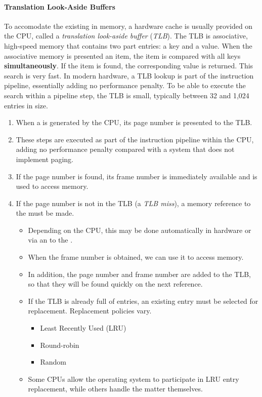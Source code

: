 \paragraph{Translation Look-Aside Buffers}\label{par:Translation_Look_Aside_Buffers}
To accomodate the  existing in memory, a hardware cache is usually provided on the CPU, called a \emph{translation look-aside buffer} (\emph{TLB}).
The TLB is associative, high-speed memory that contains two part entries: a key and a value.
When the associative memory is presented an item, the item is compared with all keys \textbf{simultaneously}.
If the item is found, the corresponding value is returned.
This search is very fast.
In modern hardware, a TLB lookup is part of the instruction pipeline, essentially adding no performance penalty.
To be able to execute the search within a pipeline step, the TLB is small, typically between 32 and 1,024  entries in size.

\begin{enumerate}[noitemsep]
\item When a  is generated by the CPU, its page number is presented to the TLB.\@
\item These steps are executed as part of the instruction pipeline within the CPU, adding no performance penalty compared with a system that does not implement paging.
\item If the page number is found, its frame number is immediately available and is used to access memory.
\item If the page number is not in the TLB (a \emph{TLB miss}), a memory reference to the  must be made.
  \begin{itemize}[noitemsep]
  \item Depending on the CPU, this may be done automatically in hardware or via an  to the .
  \item When the frame number is obtained, we can use it to access memory.
  \item In addition, the page number and frame number are added to the TLB, so that they will be found quickly on the next reference.
  \item If the TLB is already full of entries, an existing entry must be selected for replacement. Replacement policies vary.
    \begin{itemize}[noitemsep]
    \item Least Recently Used (LRU)
    \item Round-robin
    \item Random
    \end{itemize}
  \item Some CPUs allow the operating system to participate in LRU entry replacement, while others handle the matter themselves.
  \end{itemize}
\end{enumerate}

